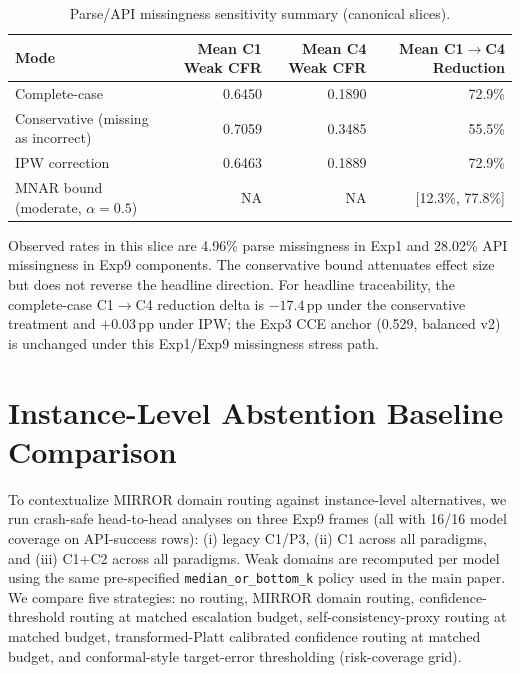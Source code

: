 \documentclass[10pt]{article}
\begin{document}
\begin{table}[h]
\centering
\caption{Parse/API missingness sensitivity summary (canonical slices).}
\label{tab:missingness}
\small
\begin{tabular}{lrrr}
\toprule
Mode & Mean C1 Weak CFR & Mean C4 Weak CFR & Mean C1$\rightarrow$C4 Reduction \\
\midrule
Complete-case & 0.6450 & 0.1890 & 72.9\% \\
Conservative (missing as incorrect) & 0.7059 & 0.3485 & 55.5\% \\
IPW correction & 0.6463 & 0.1889 & 72.9\% \\
MNAR bound (moderate, $\alpha=0.5$) & NA & NA & [12.3\%, 77.8\%] \\
\bottomrule
\end{tabular}
\end{table}

Observed rates in this slice are 4.96\% parse missingness in Exp1 and 28.02\%
API missingness in Exp9 components. The conservative bound attenuates effect size
but does not reverse the headline direction. For headline traceability, the
complete-case C1$\rightarrow$C4 reduction delta is $-17.4$\,pp under the
conservative treatment and $+0.03$\,pp under IPW; the Exp3 CCE anchor
(0.529, balanced v2) is unchanged under this Exp1/Exp9 missingness stress path.

\section{Instance-Level Abstention Baseline Comparison}
\label{app:instance-baselines}

To contextualize MIRROR domain routing against instance-level alternatives, we
run crash-safe head-to-head analyses on three Exp9 frames (all with 16/16 model
coverage on API-success rows): (i) legacy C1/P3, (ii) C1 across all paradigms,
and (iii) C1+C2 across all paradigms. Weak domains are recomputed per model
using the same pre-specified \texttt{median\_or\_bottom\_k} policy used in the
main paper. We compare five strategies: no routing, MIRROR domain routing,
confidence-threshold routing at matched escalation budget, self-consistency-proxy
routing at matched budget, transformed-Platt calibrated confidence routing at
matched budget, and conformal-style target-error thresholding (risk-coverage grid).
\end{document}
